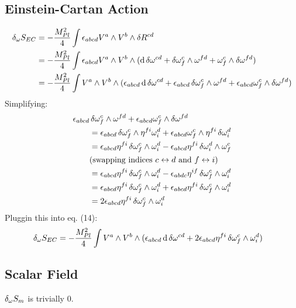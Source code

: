 \documentclass[12pt]{article}
\begin{document}
\subsection{Einstein-Cartan Action}
\begin{align}
  \var_\omega{S_{EC}} &= -\frac{M_{Pl}^2}{4} \int \epsilon_{abcd}V^a \wedge V^b \wedge \var{R^{cd}} \nonumber \\
  &= -\frac{M_{Pl}^2}{4} \int \epsilon_{abcd}V^a \wedge V^b \wedge (\dd{\var{\omega^{cd}}} + \var{\omega^c_f} \wedge \omega^{fd} + \omega^c_f \wedge \var{\omega^{fd}}) \nonumber \\
  &= -\frac{M_{Pl}^2}{4} \int V^a \wedge V^b \wedge (\epsilon_{abcd}\dd{\var{\omega^{cd}}} + \epsilon_{abcd}\var{\omega^c_f} \wedge \omega^{fd} + \epsilon_{abcd}\omega^c_f \wedge \var{\omega^{fd}})
\end{align}
Simplifying:
\begin{align*}
  \epsilon_{abcd}&\var{\omega^c_f} \wedge \omega^{fd} + \epsilon_{abcd}\omega^c_f \wedge \var{\omega^{fd}} \\
  &= \epsilon_{abcd}\var{\omega^c_f} \wedge \eta^{fi}\omega^d_i + \epsilon_{abcd}\omega^c_f \wedge \eta^{fi}\var{\omega^d_i} \\
  &= \epsilon_{abcd}\eta^{fi} \var{\omega^c_f} \wedge \omega^d_i - \epsilon_{abcd}\eta^{fi} \var{\omega^d_i} \wedge \omega^c_f \\
  &\text{(swapping indices $c \leftrightarrow d$ and $f \leftrightarrow i$)} \\
  &= \epsilon_{abcd}\eta^{fi} \var{\omega^c_f} \wedge \omega^d_i - \epsilon_{abdc}\eta^{if} \var{\omega^c_f} \wedge \omega^d_i \\
  &= \epsilon_{abcd}\eta^{fi} \var{\omega^c_f} \wedge \omega^d_i + \epsilon_{abcd}\eta^{fi} \var{\omega^c_f} \wedge \omega^d_i \\
  &= 2\epsilon_{abcd}\eta^{fi} \var{\omega^c_f} \wedge \omega^d_i
\end{align*}
Pluggin this into eq. (14):
\begin{align*}
  \var_\omega{S_{EC}} &= -\frac{M_{Pl}^2}{4} \int V^a \wedge V^b \wedge (\epsilon_{abcd}\dd{\var{\omega^{cd}}} + 2\epsilon_{abcd}\eta^{fi} \var{\omega^c_f} \wedge \omega^d_i)
\end{align*}

\subsection{Scalar Field}
$\var_\omega{S_m}$ is trivially $0$.
\end{document}
